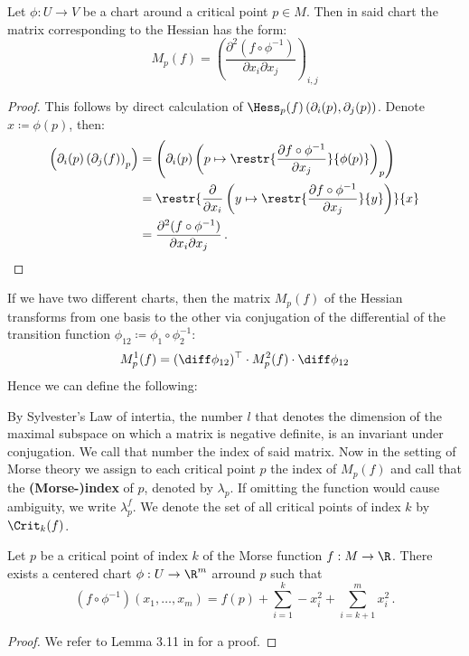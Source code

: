  \begin{corollary}\label{cor:morse-localHessian}
 	Let $\phi:U\to V$ be a  chart around a critical point $p\in M$. Then in said chart the matrix corresponding to the Hessian has the form:
 	\begin{equation*}
 		M_p(f)=\left(\frac{\partial^2 (f\circ \phi^{-1})}{\partial x_i\partial x_j}\right)_{i,j}
 	\end{equation*}
 \end{corollary}
 \begin{proof}
 	This follows by direct calculation of $\Hess_p(f)\left(\partial_i(p),\partial_j(p)\right)$. Denote $x\coloneq \phi(p)$, then:
 	\begin{align*}
 		\left(\partial_i(p)\left(\partial_j(f)\right)_p\right)
 		&=\left(\partial_i(p)
 			\left(
 				p\mapsto \restr{\frac{\partial f\circ \phi^{-1}}{\partial  x_j}}{\phi(p)}\right)_p
 			\right)\\
 		&=\restr{
 			\frac{\partial}{\partial x_i}
 				\left(
 				y \mapsto \restr{\frac{\partial f\circ \phi^{-1}}{\partial  x_j}}{y}
 				\right)
 			}{x}\\
 		&=\frac{\partial^2 (f\circ \phi^{-1})}{\partial x_i\partial x_j}\,.
 	\end{align*}
 \end{proof}
\begin{remark}
	 If we have two different charts, then the matrix $M_p(f)$ of the Hessian transforms from one basis to the other via conjugation of the differential of the transition function $\phi_{12}\coloneq \phi_1 \circ \phi_2^{-1}$:
	\begin{equation*}
		M_p^1(f)=(\diff \phi_{12})^\top  \cdot   M_p^2(f)   \cdot   \diff \phi_{12}
	\end{equation*} Hence we can define the following:
\end{remark}

\begin{definition}
	By Sylvester's Law of intertia, the number $l$ that denotes the dimension of the maximal subspace on which a matrix is negative definite, is an invariant under conjugation. We call that number the index of said matrix. Now in the setting of Morse theory we assign to each critical point $p$ the index of $M_p(f)$ and call that the \textbf{(Morse-)index} of $p$, denoted by $\lambda_p$. If omitting the function would cause ambiguity, we write $\lambda^f_p$. We denote the set of all critical points of index $k$ by $\Crit_k(f)$.
\end{definition}

\begin{theorem}\label{thm:morse-morseLemma}
	Let $p$ be a critical point of index $k$ of the Morse function $f:M\to \R$. There exists a centered chart $\phi:U\to \R^m$ arround $p$ such that 
	\begin{equation*}
		(f\circ \phi^{-1})(x_1,\dots, x_m)=f(p)+\sum_{i=1}^{k}-x_i^2+\sum_{i=k+1}^{m}x_i^2 \,.
	\end{equation*}
\end{theorem}
\begin{proof}
	We refer to Lemma 3.11 in \cite{banyaga2004lectures} for a proof. 
\end{proof}
